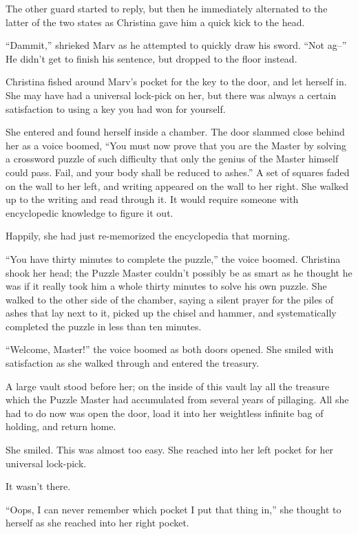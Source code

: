 \documentclass[showtrims,b6paper,draft,10pt]{memoir}
\begin{document}
The other guard started to reply, but then he immediately alternated to the latter of the two states as Christina gave him a quick kick to the head.

``Dammit,'' shrieked Marv as he attempted to quickly draw his sword.  ``Not ag--''  He didn’t get to finish his sentence, but dropped to the floor instead.

Christina fished around Marv’s pocket for the key to the door, and let herself in.  She may have had a universal lock-pick on her, but there was always a certain satisfaction to using a key you had won for yourself.

She entered and found herself inside a chamber.  The door slammed close behind her as a voice boomed, ``You must now prove that you are the Master by solving a crossword puzzle of such difficulty that only the genius of the Master himself could pass.  Fail, and your body shall be reduced to ashes.''  A set of squares faded on the wall to her left, and writing appeared on the wall to her right.  She walked up to the writing and read through it.  It would require someone with encyclopedic knowledge to figure it out.

Happily, she had just re-memorized the encyclopedia that morning.

``You have thirty minutes to complete the puzzle,'' the voice boomed.  Christina shook her head;  the Puzzle Master couldn’t possibly be as smart as he thought he was if it really took him a whole thirty minutes to solve his own puzzle.  She walked to the other side of the chamber, saying a silent prayer for the piles of ashes that lay next to it, picked up the chisel and hammer, and systematically completed the puzzle in less than ten minutes.

``Welcome, Master!''  the voice boomed as both doors opened.  She smiled with satisfaction as she walked through and entered the treasury.

A large vault stood before her;  on the inside of this vault lay all the treasure which the Puzzle Master had accumulated from several years of pillaging.  All she had to do now was open the door, load it into her weightless infinite bag of holding, and return home.

She smiled.  This was almost too easy.  She reached into her left pocket for her universal lock-pick.

It wasn’t there.

``Oops, I can never remember which pocket I put that thing in,'' she thought to herself as she reached into her right pocket.
\end{document}
